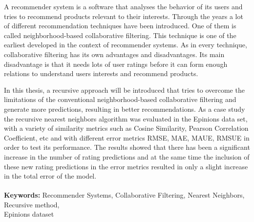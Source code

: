 
A recommender system is a software that analyses the behavior of its users and
tries to recommend products relevant to their interests. Through the years a lot
of different recommendation techniques have been introduced. One of them is called
neighborhood-based collaborative filtering. This technique is one of the
earliest developed in the context of recommender systems. As in every
technique, collaborative filtering has its own advantages and disadvantages.
Its main disadvantage is that it needs lots of user ratings
before it can form enough relations to understand users interests and
recommend products.

In this thesis, a recursive approach will be introduced that tries to
overcome the limitations of the conventional neighborhood-based collaborative
filtering and generate more predictions, resulting in
better recommendations. As a case study the recursive nearest neighbors algorithm
was evaluated in the Epinions data set, with a variety of similarity metrics
such as Cosine Similarity, Pearson Correlation Coefficient, etc and with
different error metrics RMSE, MAE, MAUE, RMSUE in order to test its performance.
The results showed that there has been a significant increase in the number of rating
predictions and at the same time the inclusion of these new rating predictions
in the error metrics resulted in only a slight increase in the total error of the model.\\\\
\justify
\textbf{Keywords:} Recommender Systems, Collaborative Filtering,
                   Nearest Neighbors, Recursive method, \\Epinions dataset
